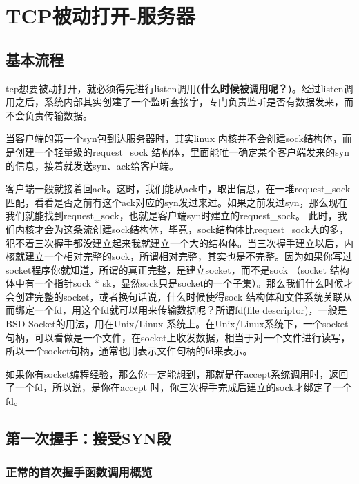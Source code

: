 \documentclass[11pt, a4paper,oneside]{book}
\theoremstyle{ocrenumbox}
\theoremstyle{purplenumbox}
\theoremstyle{blackbox}
\begin{document}
    \section{TCP被动打开-服务器}
        \subsection{基本流程}
            tcp想要被动打开，就必须得先进行listen调用\textbf{(什么时候被调用呢？)}。经过listen调用之后，系统内部其实创建了一个监听套接字，专门负责监听是否有数据发来，而不会负责传输数据。

            当客户端的第一个syn包到达服务器时，其实linux 内核并不会创建sock结构体，而是创建一个轻量级的request\_sock 结构体，里面能唯一确定某个客户端发来的syn的信息，接着就发送syn、ack给客户端。

            客户端一般就接着回ack。这时，我们能从ack中，取出信息，在一堆request\_sock匹配，看看是否之前有这个ack对应的syn发过来过。如果之前发过syn，那么现在我们就能找到request\_sock，也就是客户端syn时建立的request\_sock。 此时，我们内核才会为这条流创建sock结构体，毕竟，sock结构体比request\_sock大的多，犯不着三次握手都没建立起来我就建立一个大的结构体。当三次握手建立以后，内核就建立一个相对完整的sock，所谓相对完整，其实也是不完整。因为如果你写过socket程序你就知道，所谓的真正完整，是建立socket，而不是sock （socket 结构体中有一个指针sock * sk，显然sock只是socket的一个子集）。那么我们什么时候才会创建完整的socket，或者换句话说，什么时候使得sock 结构体和文件系统关联从而绑定一个fd，用这个fd就可以用来传输数据呢？所谓fd(file descriptor)，一般是BSD Socket的用法，用在Unix/Linux 系统上。在Unix/Linux系统下，一个socket句柄，可以看做是一个文件，在socket上收发数据，相当于对一个文件进行读写，所以一个socket句柄，通常也用表示文件句柄的fd来表示。

            如果你有socket编程经验，那么你一定能想到，那就是在accept系统调用时，返回了一个fd，所以说，是你在accept 时，你三次握手完成后建立的sock才绑定了一个 fd。
        \subsection{第一次握手：接受SYN段}
            \subsubsection{正常的首次握手函数调用概览}
                        
\end{document}
